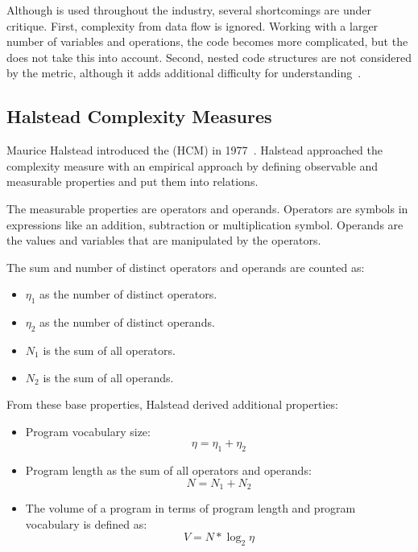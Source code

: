 Although  is used throughout the industry, several shortcomings are under critique. First, complexity from data flow is ignored. Working with a larger number of variables and operations, the code becomes more complicated, but the  does not take this into account. Second, nested code structures are not considered by the metric, although it adds additional difficulty for understanding~\cite{yu_survey_2010}.

\subsection{Halstead Complexity Measures}
Maurice Halstead introduced the  (HCM) in 1977~\cite{halstead1977elements}. Halstead approached the complexity measure with an empirical approach by defining observable and measurable properties and put them into relations.

The measurable properties are operators and operands. Operators are symbols in expressions like an addition, subtraction or multiplication symbol. Operands are the values and variables that are manipulated by the operators. 

The sum and number of distinct operators and operands are counted as:
\begin{itemize}
    \item $\eta_1$ as the number of distinct operators.
    \item $\eta_2$ as the number of distinct operands.
    \item $N_1$ is the sum of all operators.
    \item $N_2$ is the sum of all operands. 
\end{itemize}

From these base properties, Halstead derived additional properties:
\begin{itemize}
    \item Program vocabulary size:
    \begin{displaymath}
        \eta = \eta_1 + \eta_2
    \end{displaymath}
    \item Program length as the sum of all operators and operands:
    \begin{displaymath}
        N = N_1 + N_2
    \end{displaymath}
    \item The volume of a program in terms of program length and program vocabulary is defined as: 
    \begin{displaymath}
        V = N * \log_2{\eta}
    \end{displaymath}
\end{itemize}

